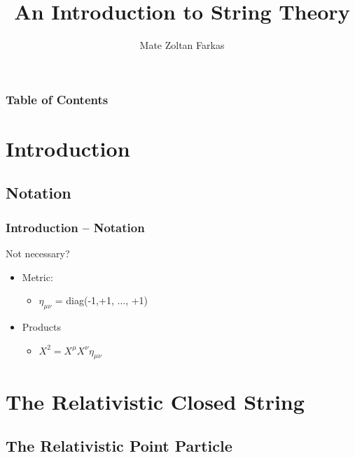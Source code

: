 \documentclass[aspectratio=169]{beamer}
\begin{document}
	
	\author{Mate Zoltan Farkas}
	\title{An Introduction to String Theory}
	
	\begin{frame}[plain]
		\maketitle
	\end{frame}
	
	\begin{frame}
		\frametitle{Table of Contents}
		\tableofcontents
	\end{frame}

	\section{Introduction}
	\subsection{Notation}
	
	\begin{frame}
		\frametitle{Introduction -- Notation}
		\LARGE \color{red} Not necessary?
		\color{black}
		\begin{itemize}
			\item Metric:
			\begin{itemize}
				\item $\eta_{\mu\nu}$ = diag(-1,+1, $\dots$, +1)
			\end{itemize}
			\item Products
			\begin{itemize}
				\item $X^2 = X^\mu X^\nu \eta_{\mu\nu}$
			\end{itemize}
		\end{itemize}
	\end{frame}

	\section{The Relativistic Closed String}
	\subsection{The Relativistic Point Particle}
	
\end{document}
